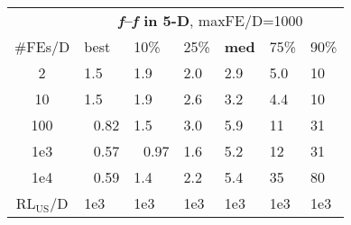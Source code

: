 \begin{tabular}{c|llllll}
 & \multicolumn{6}{|c}{\textbf{\textit{f}\raisebox{-0.35ex}{1}--\textit{f}\raisebox{-0.35ex}{24} in 5-D}, maxFE/D=1000}\\
\#FEs/D & best & 10\% & 25\% & \textbf{med} & 75\% & 90\%\\
2 & \hspace*{1ex}1.5 & \hspace*{1ex}1.9 & \hspace*{1ex}2.0 & \hspace*{1ex}2.9 & \hspace*{1ex}5.0 & 10\\
10 & \hspace*{1ex}1.5 & \hspace*{1ex}1.9 & \hspace*{1ex}2.6 & \hspace*{1ex}3.2 & \hspace*{1ex}4.4 & 10\\
100 & ~\,0.82 & \hspace*{1ex}1.5 & \hspace*{1ex}3.0 & \hspace*{1ex}5.9 & 11 & 31\\
1e3 & ~\,0.57 & ~\,0.97 & \hspace*{1ex}1.6 & \hspace*{1ex}5.2 & 12 & 31\\
1e4 & ~\,0.59 & \hspace*{1ex}1.4 & \hspace*{1ex}2.2 & \hspace*{1ex}5.4 & 35 & 80\\
$\text{RL}_{\text{US}}$/D & 1e3 & 1e3 & 1e3 & 1e3 & 1e3 & 1e3
\end{tabular}
